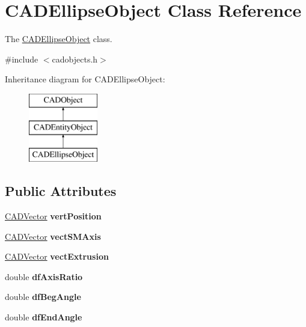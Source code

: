 \hypertarget{class_c_a_d_ellipse_object}{}\section{C\+A\+D\+Ellipse\+Object Class Reference}
\label{class_c_a_d_ellipse_object}


The \hyperlink{class_c_a_d_ellipse_object}{C\+A\+D\+Ellipse\+Object} class.  




{\ttfamily \#include $<$cadobjects.\+h$>$}

Inheritance diagram for C\+A\+D\+Ellipse\+Object\+:\begin{figure}[H]
\begin{center}
\leavevmode
\includegraphics[height=3.000000cm]{class_c_a_d_ellipse_object}
\end{center}
\end{figure}
\subsection*{Public Attributes}
\begin{DoxyCompactItemize}
\item 
\hyperlink{class_c_a_d_vector}{C\+A\+D\+Vector} {\bfseries vert\+Position}\hypertarget{class_c_a_d_ellipse_object_a5deae79d992672502a800e4fe7a1f03c}{}\label{class_c_a_d_ellipse_object_a5deae79d992672502a800e4fe7a1f03c}

\item 
\hyperlink{class_c_a_d_vector}{C\+A\+D\+Vector} {\bfseries vect\+S\+M\+Axis}\hypertarget{class_c_a_d_ellipse_object_a2526b4a1eeaeb93b42eb54c3dcf99a67}{}\label{class_c_a_d_ellipse_object_a2526b4a1eeaeb93b42eb54c3dcf99a67}

\item 
\hyperlink{class_c_a_d_vector}{C\+A\+D\+Vector} {\bfseries vect\+Extrusion}\hypertarget{class_c_a_d_ellipse_object_a9570d612f5e53a182cc58742f4d1d98a}{}\label{class_c_a_d_ellipse_object_a9570d612f5e53a182cc58742f4d1d98a}

\item 
double {\bfseries df\+Axis\+Ratio}\hypertarget{class_c_a_d_ellipse_object_ae6eb44bdcddb79622a25efb231aca2c3}{}\label{class_c_a_d_ellipse_object_ae6eb44bdcddb79622a25efb231aca2c3}

\item 
double {\bfseries df\+Beg\+Angle}\hypertarget{class_c_a_d_ellipse_object_a28219caecc8b5f7acb29f4a09613991e}{}\label{class_c_a_d_ellipse_object_a28219caecc8b5f7acb29f4a09613991e}

\item 
double {\bfseries df\+End\+Angle}\hypertarget{class_c_a_d_ellipse_object_aa87ce711d75f6681e980e2e52a6b7573}{}\label{class_c_a_d_ellipse_object_aa87ce711d75f6681e980e2e52a6b7573}

\end{DoxyCompactItemize}
